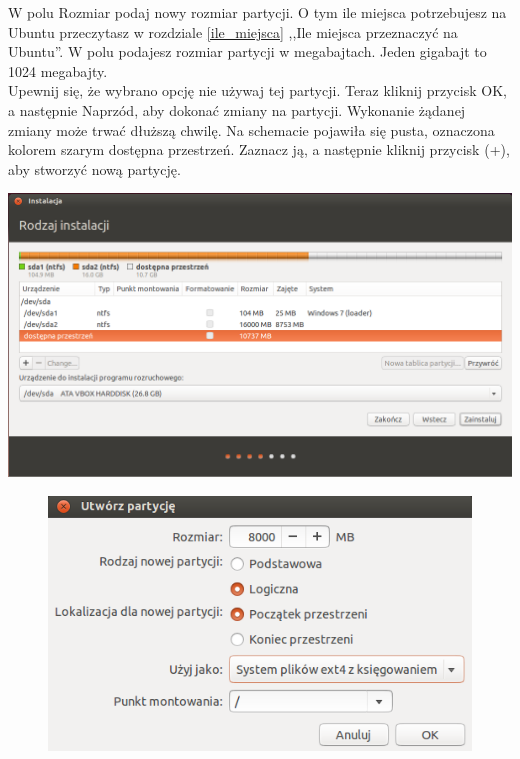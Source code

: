 W polu \textcolor{ubuntu_orange}{Rozmiar} podaj nowy rozmiar partycji. O tym ile miejsca potrzebujesz na Ubuntu przeczytasz w rozdziale \ref{ile_miejsca} ,,Ile miejsca przeznaczyć na Ubuntu''. W polu podajesz rozmiar partycji w megabajtach. Jeden gigabajt to 1024 megabajty.\\
Upewnij się, że wybrano opcję \textcolor{ubuntu_orange}{nie używaj tej partycji}. Teraz kliknij przycisk \textcolor{ubuntu_orange}{OK}, a następnie \textcolor{ubuntu_orange}{Naprzód}, aby dokonać zmiany na partycji. Wykonanie żądanej zmiany może trwać dłuższą chwilę.
Na schemacie pojawiła się pusta, oznaczona kolorem szarym \textcolor{ubuntu_orange}{dostępna przestrzeń}. Zaznacz ją, a następnie kliknij przycisk (\textcolor{ubuntu_orange}{+}), aby stworzyć nową partycję.

\begin{center}
        \includegraphics[width=\linewidth]{images/instalator_partycjonowanie_gparted3.png}
\end{center}

\begin{figure}
                \includegraphics[width=\linewidth]{images/instalator_partycjonowanie_gparted_dodaj_root.png}
\end{figure}

